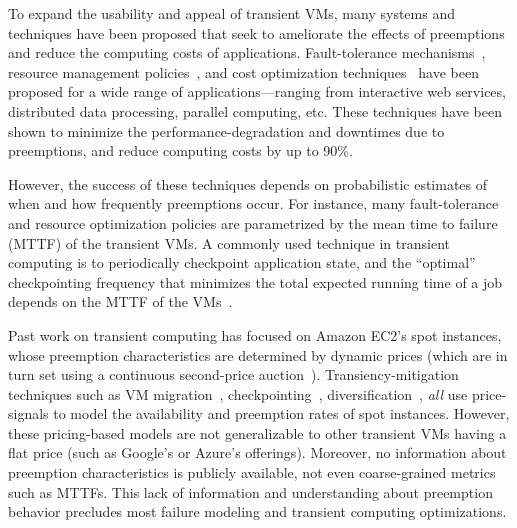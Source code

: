 To expand the usability and appeal of transient VMs, many systems and techniques have been proposed that seek to ameliorate the effects of preemptions and reduce the computing costs of applications. 
%
Fault-tolerance mechanisms~\cite{spotcheck, marathe2014exploiting}, resource management policies~\cite{exosphere, conductor}, and cost optimization techniques~\cite{dubois2016optispot, shastri2017hotspot} have been proposed for a wide range of applications---ranging from interactive web services, distributed data processing, parallel computing, etc.
%
These techniques have been shown to minimize the performance-degradation and downtimes due to preemptions, and reduce computing costs by up to 90\%. 


However, the success of these techniques depends on probabilistic estimates of when and how frequently preemptions occur. 
For instance, many fault-tolerance and resource optimization policies are parametrized by the mean time to failure (MTTF) of the transient VMs. 
A commonly used technique in transient computing is 
to periodically checkpoint application state, and the ``optimal'' checkpointing frequency that minimizes the total expected running time of a job depends on the MTTF of the VMs~\cite{daly2006higher}. 






Past work on transient computing has focused on Amazon EC2's spot instances, whose preemption characteristics are determined by dynamic prices (which are in turn set using a continuous second-price auction~\cite{spot-pricing2}). 
Transiency-mitigation techniques such as VM migration~\cite{spotcheck}, checkpointing~\cite{flint, marathe2014exploiting}, diversification~\cite{exosphere}, \emph{all} use price-signals to model the availability and preemption rates of spot instances. 
However, these pricing-based models are not generalizable to other transient VMs having a flat price (such as Google's or Azure's offerings).
%
Moreover, no information about preemption characteristics is publicly available, not even coarse-grained metrics such as MTTFs. 
%
This lack of information and understanding about preemption behavior precludes most failure modeling and transient computing optimizations. 


